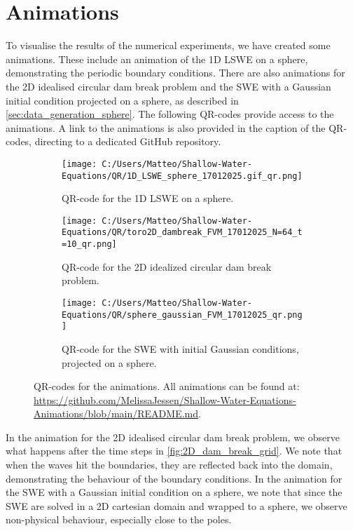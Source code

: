 \section{Animations}\label{sec:animations}
To visualise the results of the numerical experiments, we have created some animations.
These include an animation of the 1D LSWE on a sphere, demonstrating the periodic boundary conditions.
There are also animations for the 2D idealised circular dam break problem and the SWE with a Gaussian initial condition projected on a sphere, as described in \autoref{sec:data_generation_sphere}.
The following QR-codes provide access to the animations.
A link to the animations is also provided in the caption of the QR-codes, directing to a dedicated GitHub repository.
\begin{figure}[H]
    \centering
    \begin{subfigure}{0.25\textwidth}
        \begin{minipage}[t]{\textwidth}
            \centering
            \texttt{[image: C:/Users/Matteo/Shallow-Water-Equations/QR/1D\_LSWE\_sphere\_17012025.gif\_qr.png]}
            \caption{QR-code for the 1D LSWE on a sphere.}\label{fig:1D_LSWE_sphere_qr}
        \end{minipage}
    \end{subfigure}
    \hspace{1cm}
    \begin{subfigure}{0.25\textwidth}
        \begin{minipage}[t]{\textwidth}
            \centering
            \texttt{[image: C:/Users/Matteo/Shallow-Water-Equations/QR/toro2D\_dambreak\_FVM\_17012025\_N=64\_t=10\_qr.png]}
            \caption{QR-code for the 2D idealized circular dam break problem.}\label{fig:2D_dam_break_qr}
        \end{minipage}
    \end{subfigure}
    \hspace{1cm}
    \begin{subfigure}{0.25\textwidth}
        \begin{minipage}[t]{\textwidth}
            \centering
            \texttt{[image: C:/Users/Matteo/Shallow-Water-Equations/QR/sphere\_gaussian\_FVM\_17012025\_qr.png]}
            \caption{QR-code for the SWE with initial Gaussian conditions, projected on a sphere.}\label{fig:2D_dam_break_qr_part2}
        \end{minipage}
    \end{subfigure}
    \caption{QR-codes for the animations.
            All animations can be found at: \url{https://github.com/MelissaJessen/Shallow-Water-Equations-Animations/blob/main/README.md}.}\label{fig:2D_dam_break_qr_all}
\end{figure}
In the animation for the 2D idealised circular dam break problem, we observe what happens after the time steps in \autoref{fig:2D_dam_break_grid}.
We note that when the waves hit the boundaries, they are reflected back into the domain, demonstrating the behaviour of the boundary conditions.
In the animation for the SWE with a Gaussian initial condition on a sphere, we note that since the SWE are solved in a 2D cartesian domain and wrapped to a sphere, we observe non-physical behaviour, especially close to the poles.
